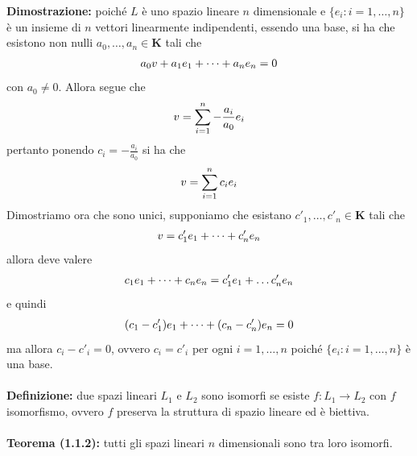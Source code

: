 \documentclass{article}
\begin{document}
\textbf{Dimostrazione:} poiché $L$ è uno spazio lineare $n$ dimensionale e $\{e_i : i = 1, \dots, n\}$ è un insieme di $n$ vettori linearmente indipendenti, essendo una base, si ha che esistono non nulli $a_0, \dots, a_n \in \mathbf{K}$ tali che
\begin{gather}
    a_0v + a_1e_1 + \dots + a_ne_n = 0 \notag
\end{gather}
con $a_0 \neq 0$. Allora segue che
\begin{gather}
    v = \sum_{i = 1}^n -\frac{a_i}{a_0}e_i \notag
\end{gather}
pertanto ponendo $c_i = -\frac{a_i}{a_0}$ si ha che
\begin{gather}
    v = \sum_{i = 1}^n c_ie_i \notag
\end{gather}
Dimostriamo ora che sono unici, supponiamo che esistano $c'_1, \dots, c'_n \in \mathbf{K}$ tali che
\begin{gather}
    v = c'_1e_1 + \dots + c'_ne_n \notag
\end{gather}
allora deve valere
\begin{gather}
    c_1e_1 + \dots + c_ne_n = c'_1e_1 + \dots c'_ne_n \notag
\end{gather}
e quindi
\begin{gather}
    (c_1 - c'_1)e_1 + \dots + (c_n - c'_n)e_n = 0 \notag
\end{gather}
ma allora $c_i - c'_i = 0$, ovvero $c_i = c'_i$ per ogni $i = 1, \dots, n$ poiché $\{e_i : i = 1, \dots, n\}$ è una base. \\ \\
\textbf{Definizione:} due spazi lineari $L_1$ e $L_2$ sono isomorfi se esiste $f : L_1 \longrightarrow L_2$ con $f$ isomorfismo, ovvero $f$ preserva la struttura di spazio lineare ed è biettiva. \\ \\
\textbf{Teorema (1.1.2):} tutti gli spazi lineari $n$ dimensionali sono tra loro isomorfi. \\
\end{document}
